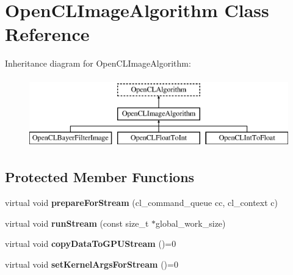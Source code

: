 \hypertarget{class_open_c_l_image_algorithm}{\section{Open\-C\-L\-Image\-Algorithm Class Reference}
\label{class_open_c_l_image_algorithm}
}
Inheritance diagram for Open\-C\-L\-Image\-Algorithm\-:\begin{figure}[H]
\begin{center}
\leavevmode
\includegraphics[height=3.000000cm]{class_open_c_l_image_algorithm}
\end{center}
\end{figure}
\subsection*{Protected Member Functions}
\begin{DoxyCompactItemize}
\item 
\hypertarget{class_open_c_l_image_algorithm_a354fcf341dd71505f3285685c20b5ce0}{virtual void {\bfseries prepare\-For\-Stream} (cl\-\_\-command\-\_\-queue cc, cl\-\_\-context c)}\label{class_open_c_l_image_algorithm_a354fcf341dd71505f3285685c20b5ce0}

\item 
\hypertarget{class_open_c_l_image_algorithm_ab3c4f306a3ed883e49f400d6b17dab65}{virtual void {\bfseries run\-Stream} (const size\-\_\-t $\ast$global\-\_\-work\-\_\-size)}\label{class_open_c_l_image_algorithm_ab3c4f306a3ed883e49f400d6b17dab65}

\item 
\hypertarget{class_open_c_l_image_algorithm_a2d0889c3023391733bd4be7a2aeefc4a}{virtual void {\bfseries copy\-Data\-To\-G\-P\-U\-Stream} ()=0}\label{class_open_c_l_image_algorithm_a2d0889c3023391733bd4be7a2aeefc4a}

\item 
\hypertarget{class_open_c_l_image_algorithm_a7b89f1e5a1fed90b1a7c50c3ea27faf1}{virtual void {\bfseries set\-Kernel\-Args\-For\-Stream} ()=0}\label{class_open_c_l_image_algorithm_a7b89f1e5a1fed90b1a7c50c3ea27faf1}

\end{DoxyCompactItemize}
